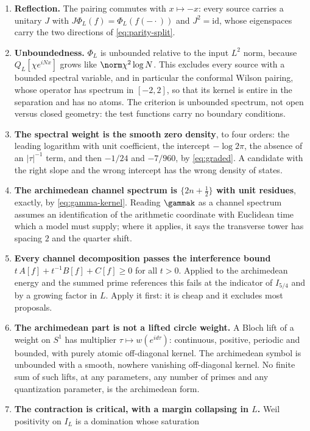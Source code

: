 \begin{enumerate}
\item\textbf{Reflection.} The pairing commutes with $x\mapsto-x$: every source
carries a unitary $J$ with $J\Phi_L(f)=\Phi_L(f(-\cdot))$ and $J^2=\mathrm{id}$,
whose eigenspaces carry the two directions of \eqref{eq:parity-split}.
\item\textbf{Unboundedness.} $\Phi_L$ is unbounded relative to the input
$L^2$ norm, because $Q_L[\chi e^{iNx}]$ grows like $\norm\chi^2\log N$. This
excludes every source with a bounded spectral variable, and in particular the
conformal Wilson pairing, whose operator has spectrum in $[-2,2]$, so that its
kernel is entire in the separation and has no atoms. The criterion is unbounded
spectrum, not open versus closed geometry: the test functions carry no
boundary conditions.
\item\textbf{The spectral weight is the smooth zero density}, to four orders:
the leading logarithm with unit coefficient, the intercept $-\log2\pi$, the
absence of an $|\tau|^{-1}$ term, and then $-1/24$ and $-7/960$, by
\eqref{eq:graded}. A candidate with the right slope and the wrong intercept has
the wrong density of states.
\item\textbf{The archimedean channel spectrum is $\{2n+\tfrac12\}$ with unit
residues}, exactly, by \eqref{eq:gamma-kernel}. Reading $\gammak$ as a channel
spectrum assumes an identification of the arithmetic coordinate with Euclidean
time which a model must supply; where it applies, it says the transverse tower
has spacing $2$ and the quarter shift.
\item\textbf{Every channel decomposition passes the interference bound}
$t\,A[f]+t^{-1}B[f]+C[f]\geq0$ for all $t>0$. Applied to the archimedean energy
and the summed prime references this fails at the indicator of $I_{5/4}$ and by
a growing factor in $L$. Apply it first: it is cheap and it excludes most
proposals.
\item\textbf{The archimedean part is not a lifted circle weight.} A Bloch lift
of a weight on $S^1$ has multiplier $\tau\mapsto w(e^{id\tau})$: continuous,
positive, periodic and bounded, with purely atomic off-diagonal kernel. The
archimedean symbol is unbounded with a smooth, nowhere vanishing off-diagonal
kernel. No finite sum of such lifts, at any parameters, any number of primes and
any quantization parameter, is the archimedean form.
\item\textbf{The contraction is critical, with a margin collapsing in $L$.}
Weil positivity on $I_L$ is a domination whose saturation

\end{enumerate}
